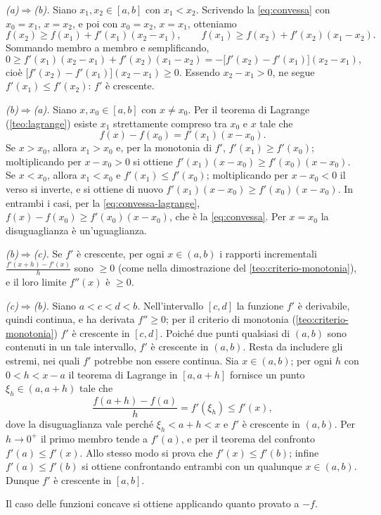 \begin{dimostrazione}
\emph{(a)$\Rightarrow$(b).} Siano $x_{1},x_{2}\in[a,b]$ con $x_{1}<x_{2}$. Scrivendo la
\eqref{eq:convessa} con $x_{0}=x_{1}$, $x=x_{2}$, e poi con $x_{0}=x_{2}$, $x=x_{1}$,
otteniamo
\[
  f(x_{2})\ge f(x_{1})+f'(x_{1})(x_{2}-x_{1}), \qquad
  f(x_{1})\ge f(x_{2})+f'(x_{2})(x_{1}-x_{2}) .
\]
Sommando membro a membro e semplificando,
\begin{equation}\label{eq:convessa-somma}
  0\ge f'(x_{1})(x_{2}-x_{1})+f'(x_{2})(x_{1}-x_{2})=-\bigl[f'(x_{2})-f'(x_{1})\bigr](x_{2}-x_{1}),
\end{equation}
cioè $\bigl[f'(x_{2})-f'(x_{1})\bigr](x_{2}-x_{1})\ge0$. Essendo $x_{2}-x_{1}>0$, ne segue
$f'(x_{1})\le f'(x_{2})$: $f'$ è crescente.

\emph{(b)$\Rightarrow$(a).} Siano $x,x_{0}\in[a,b]$ con $x\neq x_{0}$. Per il teorema di
Lagrange (\cref{teo:lagrange}) esiste $x_{1}$ strettamente compreso tra $x_{0}$ e $x$
tale che
\begin{equation}\label{eq:convessa-lagrange}
  f(x)-f(x_{0})=f'(x_{1})(x-x_{0}) .
\end{equation}
Se $x>x_{0}$, allora $x_{1}>x_{0}$ e, per la monotonia di $f'$, $f'(x_{1})\ge f'(x_{0})$;
moltiplicando per $x-x_{0}>0$ si ottiene $f'(x_{1})(x-x_{0})\ge f'(x_{0})(x-x_{0})$. Se
$x<x_{0}$, allora $x_{1}<x_{0}$ e $f'(x_{1})\le f'(x_{0})$; moltiplicando per
$x-x_{0}<0$ il verso si inverte, e si ottiene di nuovo
$f'(x_{1})(x-x_{0})\ge f'(x_{0})(x-x_{0})$. In entrambi i casi, per la
\eqref{eq:convessa-lagrange}, $f(x)-f(x_{0})\ge f'(x_{0})(x-x_{0})$, che è la
\eqref{eq:convessa}. Per $x=x_{0}$ la disuguaglianza è un'uguaglianza.

\emph{(b)$\Rightarrow$(c).} Se $f'$ è crescente, per ogni $x\in(a,b)$ i rapporti
incrementali $\frac{f'(x+h)-f'(x)}{h}$ sono $\ge0$ (come nella dimostrazione del
\cref{teo:criterio-monotonia}), e il loro limite $f''(x)$ è $\ge0$.

\emph{(c)$\Rightarrow$(b).} Siano $a<c<d<b$. Nell'intervallo $[c,d]$ la funzione $f'$ è
derivabile, quindi continua, e ha derivata $f''\ge0$; per il criterio di monotonia
(\cref{teo:criterio-monotonia}) $f'$ è crescente in $[c,d]$. Poiché due punti qualsiasi
di $(a,b)$ sono contenuti in un tale intervallo, $f'$ è crescente in $(a,b)$. Resta da
includere gli estremi, nei quali $f'$ potrebbe non essere continua. Sia $x\in(a,b)$; per
ogni $h$ con $0<h<x-a$ il teorema di Lagrange in $[a,a+h]$ fornisce un punto
$\xi_{h}\in(a,a+h)$ tale che
\[
  \frac{f(a+h)-f(a)}{h}=f'(\xi_{h})\le f'(x),
\]
dove la disuguaglianza vale perché $\xi_{h}<a+h<x$ e $f'$ è crescente in $(a,b)$. Per
$h\to0^{+}$ il primo membro tende a $f'(a)$, e per il teorema del confronto
$f'(a)\le f'(x)$. Allo stesso modo si prova che $f'(x)\le f'(b)$; infine
$f'(a)\le f'(b)$ si ottiene confrontando entrambi con un qualunque $x\in(a,b)$. Dunque
$f'$ è crescente in $[a,b]$.

Il caso delle funzioni concave si ottiene applicando quanto provato a $-f$.
\end{dimostrazione}

